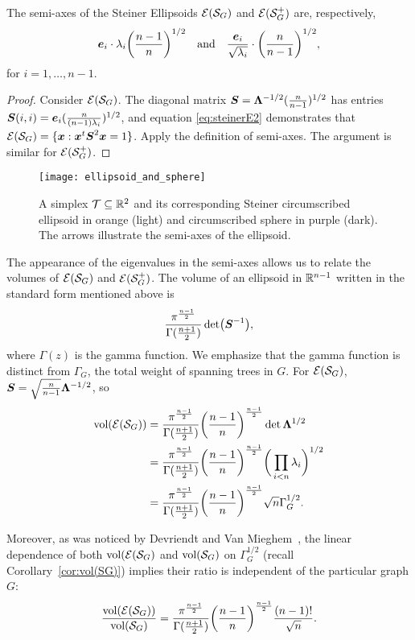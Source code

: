  \begin{lemma}
 	The semi-axes of the Steiner Ellipsoids  $\mathcal{E}(\mathcal{S}_G)$ and $\mathcal{E}(\mathcal{S}_G^+)$ are, respectively, 
 	\[\vb*{e}_i\cdot \lambda_i\bigg(\frac{n-1}{n}\bigg)^{1/2}\quad\text{and}\quad\frac{\vb*{e}_i}{\sqrt{\lambda_i} }\cdot \bigg(\frac{n}{n-1}\bigg)^{1/2}, \] 
 	for $i=1,\dots,n-1$. 
 \end{lemma}
\begin{proof}
	Consider $\mathcal{E}(\mathcal{S}_G)$. The diagonal matrix $\vb*{S}=\vb{\Lambda}^{-1/2} (\frac{n}{n-1})^{1/2}$ has entries $\vb*{S}(i,i) = \vb*{e}_i(\frac{n}{(n-1)\lambda_i})^{1/2}$, and equation  \eqref{eq:steinerE2} demonstrates  that  $\mathcal{E}(\mathcal{S}_G) = \{\vb*{x}:\vb*{x}^t \vb*{S}^2\vb*{x}=1\}$. Apply the definition of semi-axes. The argument is similar for $\mathcal{E}(\mathcal{S}_G^+)$. 
\end{proof}

\begin{figure}
	\centering
	\texttt{[image: ellipsoid\_and\_sphere]}
	\caption{A simplex $\mathcal{T}\subseteq\mathbb{R}^2$ and  its corresponding Steiner circumscribed ellipsoid in orange (light) and circumscribed sphere in purple (dark). The arrows illustrate the semi-axes of the ellipsoid.}
	\label{fig:ellipsoid_and_sphere}
\end{figure}

The appearance of the  eigenvalues  in  the semi-axes allows us to relate the volumes of $\mathcal{E}(\mathcal{S}_G)$ and $\mathcal{E}(\mathcal{S}_G^+)$.  The volume of an  ellipsoid in $\mathbb{R}^{n-1}$ written in the standard  form mentioned  above is 
\begin{equation*}
\frac{\pi^{\frac{n-1}{2}}}{\Gamma(\frac{n+1}{2})} \det(\vb*{S}^{-1}),
\end{equation*}
where $\Gamma(z)$ is the gamma function.  We emphasize  that the gamma function is distinct from $\Gamma_G$, the  total weight of spanning trees in $G$.  
For $\mathcal{E}(\mathcal{S}_G)$, $\vb*{S} = \sqrt{\frac{n}{n-1}} \vb{\Lambda}^{-1/2}$, so 
\begin{align*}
\textnormal{vol}(\mathcal{E}(\mathcal{S}_G)) &= \frac{\pi^{\frac{n-1}{2}}}{\Gamma(\frac{n+1}{2})} \bigg(\frac{n-1}{n}\bigg)^{\frac{n-1}{2}} \det\vb{\Lambda}^{1/2} \\
&= \frac{\pi^{\frac{n-1}{2}}}{\Gamma(\frac{n+1}{2})} \bigg(\frac{n-1}{n}\bigg)^{\frac{n-1}{2}}\bigg(\prod_{i<n}\lambda_i\bigg)^{1/2} \\
&= \frac{\pi^{\frac{n-1}{2}}}{\Gamma(\frac{n+1}{2})} \bigg(\frac{n-1}{n}\bigg)^{\frac{n-1}{2}} \sqrt{n}\Gamma_G^{1/2}.
\end{align*}

Moreover, as was noticed by Devriendt  and  Van Mieghem~\cite{devriendt2018simplex},  the linear dependence of both $\textnormal{vol}(\mathcal{E}(\mathcal{S}_G)$ and $\textnormal{vol}(\mathcal{S}_G)$ on $\Gamma_G^{1/2}$ (recall Corollary~\ref{cor:vol(SG)}) implies their ratio is independent of the particular graph $G$: 
\begin{equation*}
\frac{\textnormal{vol}(\mathcal{E}(\mathcal{S}_G))}{\textnormal{vol}(\mathcal{S}_G)} = \frac{\pi^{\frac{n-1}{2}}}{\Gamma(\frac{n+1}{2})} \bigg(\frac{n-1}{n}\bigg)^{\frac{n-1}{2}} \frac{(n-1)!}{\sqrt{n}}.
\end{equation*}

